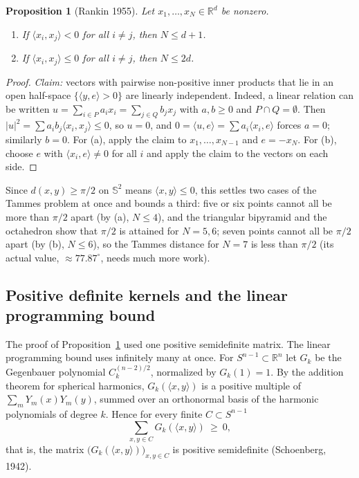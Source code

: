 \documentclass[11pt,openany]{book}
\theoremstyle{plain}
\newtheorem{proposition}[theorem]{Proposition}
\theoremstyle{definition}
\theoremstyle{remark}
\newcommand{\R}{\mathbb{R}}
\newcommand{\Sph}{\mathbb{S}}          %
\newcommand{\abs}[1]{\left\lvert #1 \right\rvert}
\newcommand{\ip}[2]{\langle #1, #2\rangle}
\begin{document}
\begin{proposition}[Rankin 1955]\label{COMP:prop:rankin}
Let $x_1,\dots,x_N\in\R^d$ be nonzero.
\begin{enumerate}[label=(\alph*),nosep]
\item If $\ip{x_i}{x_j}<0$ for all $i\ne j$, then $N\le d+1$.
\item If $\ip{x_i}{x_j}\le0$ for all $i\ne j$, then $N\le2d$.
\end{enumerate}
\end{proposition}

\begin{proof}
\emph{Claim:} vectors with pairwise non-positive inner products that lie in an open half-space
$\{\ip ye>0\}$ are linearly independent. Indeed, a linear relation can be written
$u=\sum_{i\in P}a_ix_i=\sum_{j\in Q}b_jx_j$ with $a,b\ge0$ and $P\cap Q=\emptyset$. Then
$\abs u^2=\sum a_ib_j\ip{x_i}{x_j}\le0$, so $u=0$, and $0=\ip ue=\sum a_i\ip{x_i}e$ forces $a=0$; similarly
$b=0$. For (a), apply the claim to $x_1,\dots,x_{N-1}$ and $e=-x_N$. For (b), choose $e$ with
$\ip{x_i}e\ne0$ for all $i$ and apply the claim to the vectors on each side.
\end{proof}

Since $d(x,y)\ge\pi/2$ on $\Sph^2$ means $\ip xy\le0$, this settles two cases of the Tammes problem at
once and bounds a third: five or six points cannot all be more than $\pi/2$ apart (by (a), $N\le4$), and
the triangular bipyramid and the octahedron show that $\pi/2$ is attained for $N=5,6$; seven points cannot
all be $\pi/2$ apart (by (b), $N\le6$), so the Tammes distance for $N=7$ is less than $\pi/2$ (its actual
value, $\approx77.87^\circ$, needs much more work).

\subsection{Positive definite kernels and the linear programming bound}
The proof of Proposition~\ref{COMP:prop:rankin} used one positive semidefinite matrix. The linear
programming bound uses infinitely many at once. For $S^{n-1}\subset\R^n$ let $G_k$ be the Gegenbauer
polynomial $C_k^{(n-2)/2}$, normalized by $G_k(1)=1$. By the addition theorem for spherical harmonics,
$G_k(\ip xy)$ is a positive multiple of $\sum_mY_m(x)Y_m(y)$, summed over an orthonormal basis of the
harmonic polynomials of degree $k$. Hence for every finite $C\subset S^{n-1}$
\begin{equation}\label{COMP:eq:posdef}
  \sum_{x,y\in C}G_k(\ip xy)\ \ge\ 0,
\end{equation}
that is, the matrix $\big(G_k(\ip xy)\big)_{x,y\in C}$ is positive semidefinite (Schoenberg, 1942).
\end{document}
